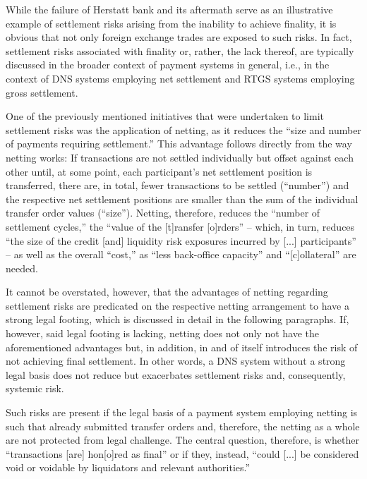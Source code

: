 While the failure of Herstatt bank and its aftermath serve as an illustrative example of settlement risks arising from the inability to achieve finality, it is obvious that not only foreign exchange trades are exposed to such risks.
In fact, settlement risks associated with finality or, rather, the lack thereof, are typically discussed in the broader context of payment systems in general, i.e., in the context of DNS systems employing net settlement and RTGS systems employing gross settlement.

One of the previously mentioned initiatives that were undertaken to limit settlement risks was the application of netting, as it reduces the ``size and number of payments requiring settlement.'' \autocite[59]{galati2002}
This advantage follows directly from the way netting works:
If transactions are not settled individually but offset against each other until, at some point, each participant's net settlement position is transferred, there are, in total, fewer transactions to be settled (``number'') and the respective net settlement positions are smaller than the sum of the individual transfer order values (``size'').
Netting, therefore, reduces the ``number of settlement cycles,'' the ``value of the [t]ransfer [o]rders'' -- which, in turn, reduces ``the size of the credit [and] liquidity risk exposures incurred by [...] participants'' -- as well as the overall ``cost,'' as ``less back-office capacity'' and ``[c]ollateral'' are needed. \autocite[40]{vereecken2003}

It cannot be overstated, however, that the advantages of netting regarding settlement risks are predicated on the respective netting arrangement to have a strong legal footing, which is discussed in detail in the following paragraphs.
If, however, said legal footing is lacking, netting does not only not have the aforementioned advantages but, in addition, in and of itself introduces the risk of not achieving final settlement.
In other words, a DNS system without a strong legal basis does not reduce but exacerbates settlement risks and, consequently, systemic risk.

Such risks are present if the legal basis of a payment system employing netting is such that already submitted transfer orders and, therefore, the netting as a whole are not protected from legal challenge.
The central question, therefore, is whether ``transactions [are] hon[o]red as final'' or if they, instead, ``could [...] be considered void or voidable by liquidators and relevant authorities.'' \autocite[16]{bis2016cpmiglossary}

